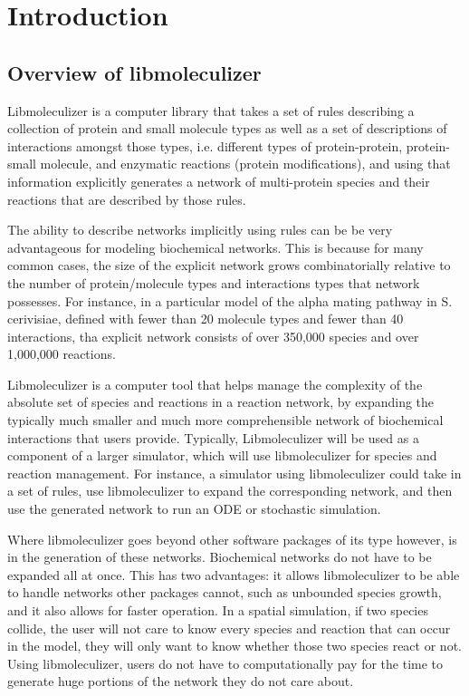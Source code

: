 \chapter{Introduction}
\label{chap:introduction}

\section{Overview of libmoleculizer}
Libmoleculizer is a computer library that takes a set of rules
describing a collection of protein and small molecule types as well as
a set of descriptions of interactions amongst those types,
i.e. different types of protein-protein, protein-small molecule, and
enzymatic reactions (protein modifications), and using that
information explicitly generates a network of multi-protein species
and their reactions that are described by those rules.

The ability to describe networks implicitly using rules can be be
very advantageous for modeling biochemical networks.  This is because
for many common cases, the size of the explicit network grows
combinatorially relative to the number of protein/molecule types and
interactions types that network possesses.  For instance, in a particular
model of the alpha mating pathway in S. cerivisiae, defined
with fewer than 20 molecule types and fewer than 40 interactions, tha
explicit network consists of over 350,000 species and over 1,000,000
reactions.

Libmoleculizer is a computer tool that helps manage the complexity of
the absolute set of species and reactions in a reaction network, by
expanding the typically much smaller and much more comprehensible
network of biochemical interactions that users provide.  Typically,
Libmoleculizer will be used as a component of a larger simulator,
which will use libmoleculizer for species and reaction management.
For instance, a simulator using libmoleculizer could take in a set of
rules, use libmoleculizer to expand the corresponding network, and
then use the generated network to run an ODE or stochastic simulation.

Where libmoleculizer goes beyond other software packages of its type
however, is in the generation of these networks.  Biochemical networks
do not have to be expanded all at once.  This has two advantages: it
allows libmoleculizer to be able to handle networks other packages
cannot, such as unbounded species growth, and it also allows for
faster operation.  In a spatial simulation, if two species collide,
the user will not care to know every species and reaction that can
occur in the model, they will only want to know whether those two
species react or not.  Using libmoleculizer, users do not have to
computationally pay for the time to generate huge portions of the
network they do not care about.  

